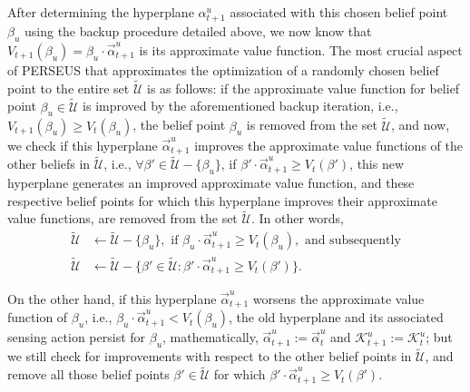 \documentclass[12pt, draftcls, onecolumn]{IEEEtran}
\begin{document}
After determining the hyperplane $\alpha_{t+1}^{u}$ associated with this chosen belief point $\beta_{u}$ using the backup procedure detailed above, we now know that $V_{t+1}(\beta_{u}){=}\beta_{u}{\cdot}\vec{\alpha}_{t+1}^{u}$ is its approximate value function. The most crucial aspect of PERSEUS that approximates the optimization of a randomly chosen belief point to the entire set $\tilde{\mathcal{U}}$ is as follows: if the approximate value function for belief point $\beta_{u}{\in}\tilde{\mathcal{U}}$ is improved by the aforementioned backup iteration, i.e., $V_{t+1}(\beta_{u}){\geq}V_{t}(\beta_{u})$, the belief point $\beta_{u}$ is removed from the set $\tilde{\mathcal{U}}$, and now, we check if this hyperplane $\vec{\alpha}_{t+1}^{u}$ improves the approximate value functions of the other beliefs in $\tilde{\mathcal{U}}$, i.e., ${\forall}\beta'{\in}\tilde{\mathcal{U}}{-}\{\beta_{u}\}$, if $\beta'{\cdot}\vec{\alpha}_{t+1}^{u}{\geq}V_{t}(\beta')$, this new hyperplane generates an improved approximate value function, and these respective belief points for which this hyperplane improves their approximate value functions, are removed from the set $\tilde{\mathcal{U}}$. In other words,
\begin{equation}\label{28}
    \begin{aligned}
        \tilde{\mathcal{U}} &\longleftarrow \tilde{\mathcal{U}}-\{\beta_{u}\},\text{ if }\beta_{u}{\cdot}\vec{\alpha}_{t+1}^{u} \geq V_{t}(\beta_{u}),\text{ and subsequently}\\
        \tilde{\mathcal{U}} &\longleftarrow \tilde{\mathcal{U}}-\{\beta' \in \tilde{\mathcal{U}}:\beta' \cdot \vec{\alpha}_{t+1}^{u} \geq V_{t}(\beta')\}.
    \end{aligned}
\end{equation}

On the other hand, if this hyperplane $\vec{\alpha}_{t+1}^{u}$ worsens the approximate value function of $\beta_{u}$, i.e., $\beta_{u}{\cdot}\vec{\alpha}_{t+1}^{u}{<}V_{t}(\beta_{u})$, the old hyperplane and its associated sensing action persist for $\beta_{u}$, mathematically, $\vec{\alpha}_{t+1}^{u}{:=}\vec{\alpha}_{t}^{u}$ and $\mathcal{K}_{t+1}^{u}{:=}\mathcal{K}_{t}^{u}$; but we still check for improvements with respect to the other belief points in $\tilde{\mathcal{U}}$, and remove all those belief points $\beta'{\in}\tilde{\mathcal{U}}$ for which $\beta'{\cdot}\vec{\alpha}_{t+1}^{u}{\geq}V_{t}(\beta')$. 
\end{document}
